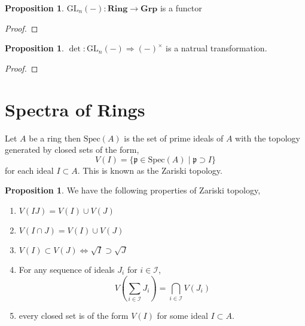\documentclass[12pt]{article}
\newcommand{\GL}[2]{\mathrm{GL}_{#1}(#2)}
\newcommand{\Grp}{\mathbf{Grp}}
\newcommand{\Ring}{\mathbf{Ring}}
\newcommand{\Spec}[1]{\mathrm{Spec}\left( #1 \right)}
\newcommand{\p}{\mathfrak{p}}
\theoremstyle{remark}
\theoremstyle{definition}
\newtheorem{proposition}[theorem]{Proposition}
\newenvironment{definition}[1][Definition:]{\begin{trivlist}
\item[\hskip \labelsep {\bfseries #1}]}{\end{trivlist}}
\begin{document}
\begin{proposition}
$\GL{n}{-} : \Ring \to \Grp$ is a functor
\end{proposition}

\begin{proof}

\end{proof}

\begin{proposition}
$\det : \GL{n}{-} \Longrightarrow (-)^\times$ is a natrual transformation. 
\end{proposition}

\begin{proof}

\end{proof}

\section{Spectra of Rings}

\begin{definition}
Let $A$ be a ring then $\Spec{A}$ is the set of prime ideals of $A$ with the topology generated by closed sets of the form,
\[ V(I) = \{ \p \in \Spec{A} \mid \p \supset I \} \]
for each ideal $I \subset A$. This is known as the Zariski topology.
\end{definition}

\begin{proposition}
We have the following properties of Zariski topology,
\begin{enumerate}
\item $V(IJ) = V(I) \cup V(J)$
\item $V(I \cap J) = V(I) \cup V(J)$
\item $V(I) \subset V(J) \iff \sqrt{I} \supset \sqrt{J}$
\item For any sequence of ideals $J_i$ for $i \in \mathcal{I}$,
\[ V \left( \sum_{i \in \mathcal{I}} J_i \right) = \bigcap_{i \in \mathcal{I}} V(J_i) \]
\item every closed set is of the form $V(I)$ for some ideal $I \subset A$. 
\end{enumerate}
\end{proposition}
\end{document}

